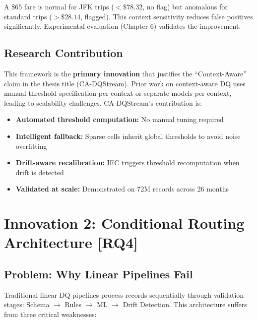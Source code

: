 \begin{enumerate}
        A \$65 fare is normal for JFK trips ($< \$78.32$, no flag) but anomalous for standard trips ($> \$28.14$, flagged). This context sensitivity reduces false positives significantly. Experimental evaluation (Chapter 6) validates the improvement.
\end{enumerate}

\subsection{Research Contribution}

This framework is the \textbf{primary innovation} that justifies the ``Context-Aware'' claim in the thesis title (CA-DQStream). Prior work on context-aware DQ uses manual threshold specification per context or separate models per context, leading to scalability challenges. CA-DQStream's contribution is:

\begin{itemize}
    \item \textbf{Automated threshold computation:} No manual tuning required
    \item \textbf{Intelligent fallback:} Sparse cells inherit global thresholds to avoid noise overfitting
    \item \textbf{Drift-aware recalibration:} IEC triggers threshold recomputation when drift is detected
    \item \textbf{Validated at scale:} Demonstrated on 72M records across 26 months
\end{itemize}

\section{Innovation 2: Conditional Routing Architecture [RQ4]}

\subsection{Problem: Why Linear Pipelines Fail}

Traditional linear DQ pipelines process records sequentially through validation stages: Schema $\rightarrow$ Rules $\rightarrow$ ML $\rightarrow$ Drift Detection. This architecture suffers from three critical weaknesses:

